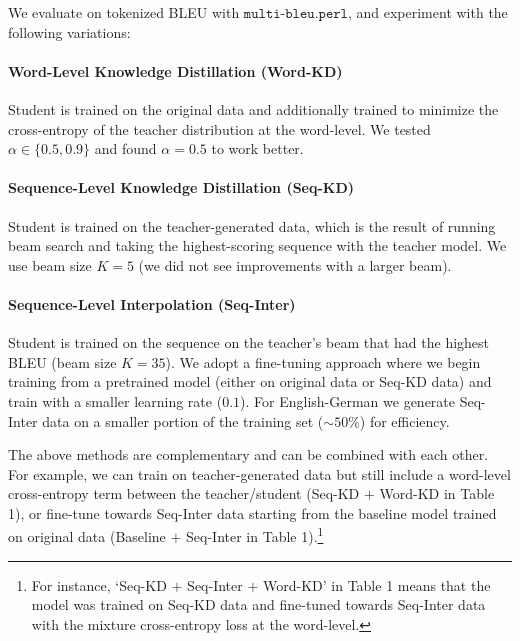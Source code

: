 \documentclass[11pt,letterpaper]{article}
\begin{document}
We evaluate on tokenized BLEU with  $\texttt{multi-bleu.perl}$, and experiment with the following variations:
\paragraph{Word-Level Knowledge Distillation (Word-KD)} Student is 
trained on the original data and additionally trained to minimize the cross-entropy of
the teacher distribution at the word-level. We tested $\alpha \in \{0.5, 0.9\}$ and found
$\alpha = 0.5$ to work better.
 \paragraph{Sequence-Level Knowledge Distillation (Seq-KD)} Student is trained on
  the teacher-generated data, which is the result of running beam search
  and taking the highest-scoring sequence with the teacher model. We use beam size $K= 5$ (we did not see
improvements with a larger beam).
 \paragraph{Sequence-Level Interpolation (Seq-Inter)} Student is trained on the sequence on
  the teacher's beam that had the highest BLEU (beam size $K=35$). We adopt a fine-tuning approach where we begin training from a pretrained model 
(either on original data or Seq-KD data) and train with a smaller learning rate ($0.1$). 
 For English-German we generate Seq-Inter data on a smaller portion of the
 training set  ($\sim50\%$) for efficiency.

The above methods are complementary and can be combined with each other. For example,
we can train on teacher-generated data but still include a word-level cross-entropy term
between the teacher/student (Seq-KD $+$ Word-KD in Table 1), or fine-tune towards
Seq-Inter data starting from the baseline model trained on original data
(Baseline $+$ Seq-Inter in Table 1).\footnote{For instance, `Seq-KD $+$ Seq-Inter $+$ Word-KD' in Table 1 means
that the model was trained on Seq-KD data and fine-tuned towards Seq-Inter data with the
mixture cross-entropy loss at the word-level.}
\end{document}
